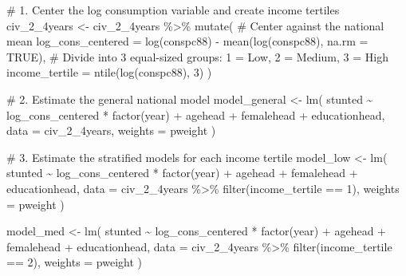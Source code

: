 \documentclass[
  letterpaper,
  DIV=11,
  numbers=noendperiod]{scrartcl}
\newenvironment{Shaded}{\begin{snugshade}}{\end{snugshade}}
\newcommand{\AttributeTok}[1]{\textcolor[rgb]{0.40,0.45,0.13}{#1}}
\newcommand{\CommentTok}[1]{\textcolor[rgb]{0.37,0.37,0.37}{#1}}
\newcommand{\ConstantTok}[1]{\textcolor[rgb]{0.56,0.35,0.01}{#1}}
\newcommand{\DecValTok}[1]{\textcolor[rgb]{0.68,0.00,0.00}{#1}}
\newcommand{\FunctionTok}[1]{\textcolor[rgb]{0.28,0.35,0.67}{#1}}
\newcommand{\NormalTok}[1]{\textcolor[rgb]{0.00,0.23,0.31}{#1}}
\newcommand{\OtherTok}[1]{\textcolor[rgb]{0.00,0.23,0.31}{#1}}
\newcommand{\SpecialCharTok}[1]{\textcolor[rgb]{0.37,0.37,0.37}{#1}}
\begin{document}
\begin{Shaded}
\begin{Highlighting}[]
\CommentTok{\# 1. Center the log consumption variable and create income tertiles}
\NormalTok{civ\_2\_4years }\OtherTok{\textless{}{-}}\NormalTok{ civ\_2\_4years }\SpecialCharTok{\%\textgreater{}\%}
  \FunctionTok{mutate}\NormalTok{(}
    \CommentTok{\# Center against the national mean}
    \AttributeTok{log\_cons\_centered =} \FunctionTok{log}\NormalTok{(conspc88) }\SpecialCharTok{{-}} \FunctionTok{mean}\NormalTok{(}\FunctionTok{log}\NormalTok{(conspc88), }\AttributeTok{na.rm =} \ConstantTok{TRUE}\NormalTok{),}
    \CommentTok{\# Divide into 3 equal{-}sized groups: 1 = Low, 2 = Medium, 3 = High}
    \AttributeTok{income\_tertile =} \FunctionTok{ntile}\NormalTok{(}\FunctionTok{log}\NormalTok{(conspc88), }\DecValTok{3}\NormalTok{) }
\NormalTok{  )}

\CommentTok{\# 2. Estimate the general national model}
\NormalTok{model\_general }\OtherTok{\textless{}{-}} \FunctionTok{lm}\NormalTok{(}
\NormalTok{  stunted }\SpecialCharTok{\textasciitilde{}}\NormalTok{ log\_cons\_centered }\SpecialCharTok{*} \FunctionTok{factor}\NormalTok{(year) }\SpecialCharTok{+}\NormalTok{ agehead }\SpecialCharTok{+}\NormalTok{ femalehead }\SpecialCharTok{+}\NormalTok{ educationhead, }
  \AttributeTok{data =}\NormalTok{ civ\_2\_4years, }
  \AttributeTok{weights =}\NormalTok{ pweight}
\NormalTok{)}

\CommentTok{\# 3. Estimate the stratified models for each income tertile}
\NormalTok{model\_low }\OtherTok{\textless{}{-}} \FunctionTok{lm}\NormalTok{(}
\NormalTok{  stunted }\SpecialCharTok{\textasciitilde{}}\NormalTok{ log\_cons\_centered }\SpecialCharTok{*} \FunctionTok{factor}\NormalTok{(year) }\SpecialCharTok{+}\NormalTok{ agehead }\SpecialCharTok{+}\NormalTok{ femalehead }\SpecialCharTok{+}\NormalTok{ educationhead, }
  \AttributeTok{data =}\NormalTok{ civ\_2\_4years }\SpecialCharTok{\%\textgreater{}\%} \FunctionTok{filter}\NormalTok{(income\_tertile }\SpecialCharTok{==} \DecValTok{1}\NormalTok{), }
  \AttributeTok{weights =}\NormalTok{ pweight}
\NormalTok{)}

\NormalTok{model\_med }\OtherTok{\textless{}{-}} \FunctionTok{lm}\NormalTok{(}
\NormalTok{  stunted }\SpecialCharTok{\textasciitilde{}}\NormalTok{ log\_cons\_centered }\SpecialCharTok{*} \FunctionTok{factor}\NormalTok{(year) }\SpecialCharTok{+}\NormalTok{ agehead }\SpecialCharTok{+}\NormalTok{ femalehead }\SpecialCharTok{+}\NormalTok{ educationhead, }
  \AttributeTok{data =}\NormalTok{ civ\_2\_4years }\SpecialCharTok{\%\textgreater{}\%} \FunctionTok{filter}\NormalTok{(income\_tertile }\SpecialCharTok{==} \DecValTok{2}\NormalTok{), }
  \AttributeTok{weights =}\NormalTok{ pweight}
\NormalTok{)}


\end{Highlighting}
\end{Shaded}
\end{document}
